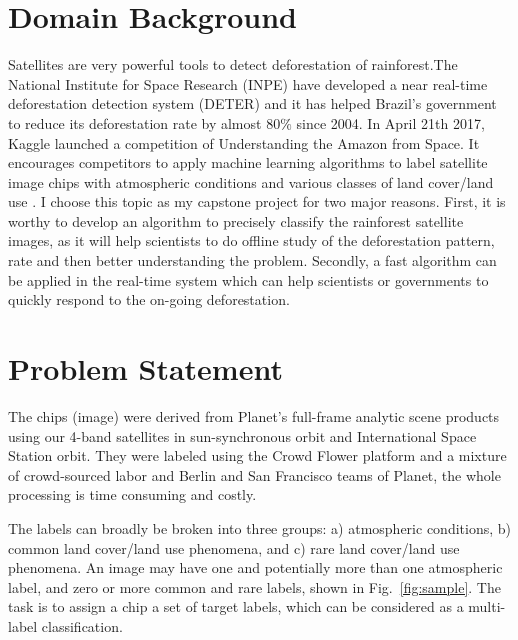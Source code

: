 \documentclass[11pt,oneside,a4paper]{article}
\begin{document}


\section{Domain Background}
\label{S:1}
Satellites are very powerful tools to detect deforestation of rainforest.The National Institute for Space Research (INPE) have developed a near real-time deforestation detection system (DETER) and it has helped Brazil’s government to reduce its deforestation rate by almost $80\%$ since 2004\cite{amazonnature}. In April 21th 2017, Kaggle launched a competition of Understanding the Amazon from Space. It encourages competitors to apply machine learning algorithms to label satellite image chips with atmospheric conditions and various classes of land cover/land use \cite{amazonkaggle}. I choose this topic as my capstone project for two major reasons. First, it is worthy to develop an algorithm to precisely classify the rainforest satellite images, as it will help scientists to do offline study of the deforestation pattern, rate and then better understanding the problem. Secondly, a fast algorithm can be applied in the real-time system which can help scientists or governments to quickly respond to the on-going deforestation.

\section{Problem Statement}
\label{S:2}
The chips (image) were derived from Planet's full-frame analytic scene products using our 4-band satellites in sun-synchronous orbit and International Space Station orbit. They were labeled using the Crowd Flower platform and a mixture of crowd-sourced labor and Berlin and San Francisco teams of Planet, the whole processing is time consuming and costly.

The labels can broadly be broken into three groups: a) atmospheric conditions, b) common land cover/land use phenomena, and c) rare land cover/land use phenomena. An image may have one and potentially more than one atmospheric label, and zero or more common and rare labels, shown in Fig.~\ref{fig:sample}. The task is to assign a chip a set of target labels, which can be considered as a multi-label classification.
\end{document}
